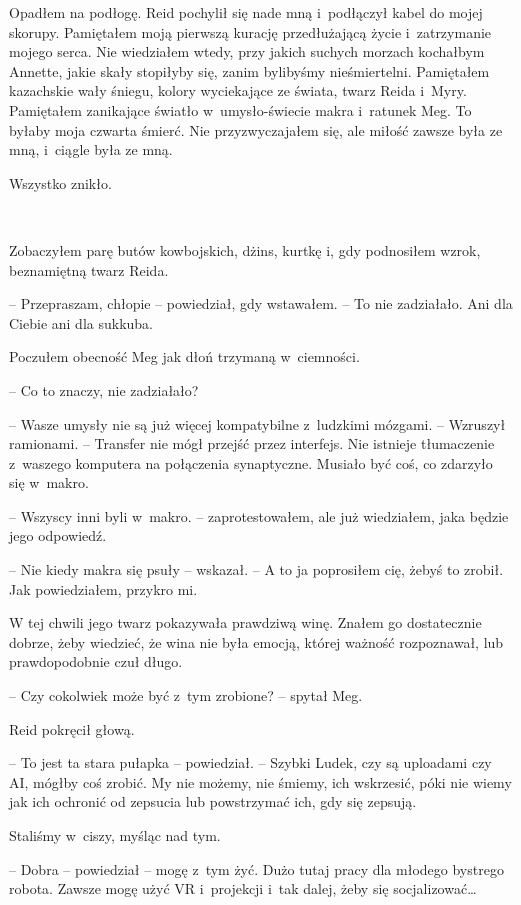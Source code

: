 \documentclass[oneside,polish,11pt,sfheadings]{mwbk}
\begin{document}
Opadłem na podłogę. Reid pochylił się nade mną i~podłączył kabel do
mojej skorupy. Pamiętałem moją pierwszą kurację przedłużającą życie i~zatrzymanie mojego serca. Nie wiedziałem wtedy, przy jakich suchych
morzach kochałbym Annette, jakie skały stopiłyby się, zanim bylibyśmy
nieśmiertelni. Pamiętałem kazachskie wały śniegu, kolory wyciekające ze
świata, twarz Reida i~Myry. Pamiętałem zanikające światło w~umysło-świecie makra i~ratunek Meg. To byłaby moja czwarta śmierć. Nie
przyzwyczajałem się, ale miłość zawsze była ze mną, i~ciągle była ze
mną.

Wszystko znikło.

~

Zobaczyłem parę butów kowbojskich, dżins, kurtkę i, gdy podnosiłem
wzrok, beznamiętną twarz Reida.

-- Przepraszam, chłopie -- powiedział, gdy wstawałem. -- To nie zadziałało.
Ani dla Ciebie ani dla sukkuba.

Poczułem obecność Meg jak dłoń trzymaną w~ciemności.

-- Co to znaczy, nie zadziałało?

-- Wasze umysły nie są już więcej kompatybilne z~ludzkimi mózgami. -- Wzruszył ramionami. -- Transfer nie mógł przejść przez interfejs. Nie
istnieje tłumaczenie z~waszego komputera na połączenia synaptyczne.
Musiało być coś, co zdarzyło się w~makro.

-- Wszyscy inni byli w~makro. -- zaprotestowałem, ale już wiedziałem, jaka
będzie jego odpowiedź.

-- Nie kiedy makra się psuły -- wskazał. -- A to ja poprosiłem cię, żebyś
to zrobił. Jak powiedziałem, przykro mi.

W tej chwili jego twarz pokazywała prawdziwą winę. Znałem go
dostatecznie dobrze, żeby wiedzieć, że wina nie była emocją, której
ważność rozpoznawał, lub prawdopodobnie czuł długo.

-- Czy cokolwiek może być z~tym zrobione? -- spytał Meg.

Reid pokręcił głową. 

-- To jest ta stara pułapka -- powiedział. -- Szybki
Ludek, czy są uploadami czy AI, mógłby coś zrobić. My nie możemy, nie
śmiemy, ich wskrzesić, póki nie wiemy jak ich ochronić od zepsucia lub
powstrzymać ich, gdy się zepsują.

Staliśmy w~ciszy, myśląc nad tym.

-- Dobra -- powiedział -- mogę z~tym żyć. Dużo tutaj pracy dla młodego
bystrego robota. Zawsze mogę użyć VR i~projekcji i~tak dalej, żeby się
socjalizować\ldots
\end{document}
